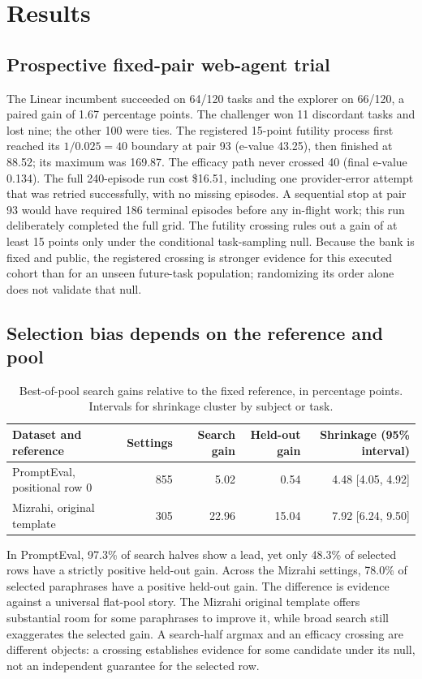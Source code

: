 \documentclass[11pt]{article}
\begin{document}
\section{Results}
\label{sec:results}
\subsection{Prospective fixed-pair web-agent trial}
The Linear incumbent succeeded on 64/120 tasks and the explorer on 66/120, a paired gain of 1.67 percentage points. The challenger won 11 discordant tasks and lost nine; the other 100 were ties. The registered 15-point futility process first reached its $1/0.025=40$ boundary at pair 93 (e-value 43.25), then finished at 88.52; its maximum was 169.87. The efficacy path never crossed 40 (final e-value 0.134). The full 240-episode run cost \$16.51, including one provider-error attempt that was retried successfully, with no missing episodes. A sequential stop at pair 93 would have required 186 terminal episodes before any in-flight work; this run deliberately completed the full grid. The futility crossing rules out a gain of at least 15 points only under the conditional task-sampling null. Because the bank is fixed and public, the registered crossing is stronger evidence for this executed cohort than for an unseen future-task population; randomizing its order alone does not validate that null.

\subsection{Selection bias depends on the reference and pool}
\begin{table}[ht]
\centering
\caption{Best-of-pool search gains relative to the fixed reference, in percentage points. Intervals for shrinkage cluster by subject or task.}
\small
\setlength{\tabcolsep}{4pt}
\begin{tabular}{lrrrr}
\toprule
Dataset and reference & Settings & Search gain & Held-out gain & Shrinkage (95\% interval)\\
\midrule
PromptEval, positional row 0 & 855 & 5.02 & 0.54 & 4.48 [4.05, 4.92]\\
Mizrahi, original template & 305 & 22.96 & 15.04 & 7.92 [6.24, 9.50]\\
\bottomrule
\end{tabular}
\label{tab:selection}
\end{table}

In PromptEval, 97.3\% of search halves show a lead, yet only 48.3\% of selected rows have a strictly positive held-out gain. Across the Mizrahi settings, 78.0\% of selected paraphrases have a positive held-out gain. The difference is evidence against a universal flat-pool story. The Mizrahi original template offers substantial room for some paraphrases to improve it, while broad search still exaggerates the selected gain. A search-half argmax and an efficacy crossing are different objects: a crossing establishes evidence for some candidate under its null, not an independent guarantee for the selected row.
\end{document}
